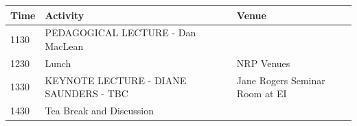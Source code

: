 \documentclass[12pt,]{book}
\begin{document}
\begin{longtable}[]{@{}lll@{}}
\toprule
\begin{minipage}[b]{0.09\columnwidth}\raggedright\strut
Time\strut
\end{minipage} & \begin{minipage}[b]{0.33\columnwidth}\raggedright\strut
Activity\strut
\end{minipage} & \begin{minipage}[b]{0.38\columnwidth}\raggedright\strut
Venue\strut
\end{minipage}\tabularnewline
\midrule
\endhead
\begin{minipage}[t]{0.09\columnwidth}\raggedright\strut
1130\strut
\end{minipage} & \begin{minipage}[t]{0.33\columnwidth}\raggedright\strut
PEDAGOGICAL LECTURE - Dan MacLean\strut
\end{minipage} & \begin{minipage}[t]{0.38\columnwidth}\raggedright\strut
\strut
\end{minipage}\tabularnewline
\begin{minipage}[t]{0.09\columnwidth}\raggedright\strut
1230\strut
\end{minipage} & \begin{minipage}[t]{0.33\columnwidth}\raggedright\strut
Lunch\strut
\end{minipage} & \begin{minipage}[t]{0.38\columnwidth}\raggedright\strut
NRP Venues\strut
\end{minipage}\tabularnewline
\begin{minipage}[t]{0.09\columnwidth}\raggedright\strut
1330\strut
\end{minipage} & \begin{minipage}[t]{0.33\columnwidth}\raggedright\strut
KEYNOTE LECTURE - DIANE SAUNDERS - TBC\strut
\end{minipage} & \begin{minipage}[t]{0.38\columnwidth}\raggedright\strut
Jane Rogers Seminar Room at EI\strut
\end{minipage}\tabularnewline
\begin{minipage}[t]{0.09\columnwidth}\raggedright\strut
1430\strut
\end{minipage} & \begin{minipage}[t]{0.33\columnwidth}\raggedright\strut
Tea Break and Discussion\strut
\end{minipage} & \begin{minipage}[t]{0.38\columnwidth}\raggedright\strut

\end{minipage}
\end{longtable}
\end{document}
